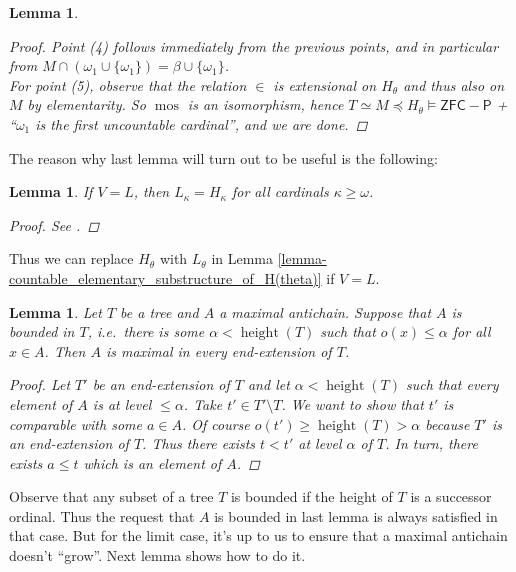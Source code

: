 \documentclass[11pt,a4paper]{report}
\newtheorem{lemma}[theorem]{Lemma}
\theoremstyle{definition}
\theoremstyle{num.custom-title}
\theoremstyle{custom-title}
\DeclareMathOperator{\sm}{\setminus}
\DeclareMathOperator{\height}{height}
\DeclareMathOperator{\mos}{mos}
\begin{document}
\begin{lemma}
\begin{proof}
Point (4) follows immediately from the previous points, and in particular from $M \cap (\omega_1 \cup \{\omega_1\}) = \beta \cup \{\omega_1\}$.\\
For point (5), observe that the relation $\in$ is extensional on $H_\theta$ and thus also on $M$ by elementarity. So $\mos$ is an isomorphism, hence $T \simeq M \preceq H_\theta \models \mathsf{ZFC-P}$ + ``$\omega_1$ is the first uncountable cardinal'', and we are done.
\end{proof}
\end{lemma}

The reason why last lemma will turn out to be useful is the following:

\begin{lemma}\label{lemma-V=L_implies_L(kappa)=H(kappa)}
If $V=L$, then $L_\kappa = H_\kappa$ for all cardinals $\kappa \geq \omega$.
\begin{proof}
See \cite[p.\ 141]{Kun2013}.
\end{proof}
\end{lemma}

Thus we can replace $H_\theta$ with $L_\theta$ in Lemma \ref{lemma-countable_elementary_substructure_of_H(theta)} if $V=L$.

\begin{lemma}\label{lemma-maximal_antichain_end_extensions}
Let $T$ be a tree and $A$ a maximal antichain. Suppose that $A$ is \emph{bounded in $T$}, i.e.\ there is some $\alpha < \height(T)$ such that $o(x) \leq \alpha$ for all $x \in A$. Then $A$ is maximal in every end-extension of $T$.
\begin{proof}
Let $T'$ be an end-extension of $T$ and let $\alpha < \height(T)$ such that every element of $A$ is at level $\leq \alpha$. Take $t' \in T' \sm T$. We want to show that $t'$ is comparable with some $a \in A$. Of course $o(t') \geq \height(T) > \alpha$ because $T'$ is an end-extension of $T$. Thus there exists $t<t'$ at level $\alpha$ of $T$. In turn, there exists $a \leq t$ which is an element of $A$.
\end{proof}
\end{lemma}

Observe that any subset of a tree $T$ is bounded if the height of $T$ is a successor ordinal. Thus the request that $A$ is bounded in last lemma is always satisfied in that case. But for the limit case, it's up to us to ensure that a maximal antichain doesn't ``grow''. Next lemma shows how to do it.
\end{document}

